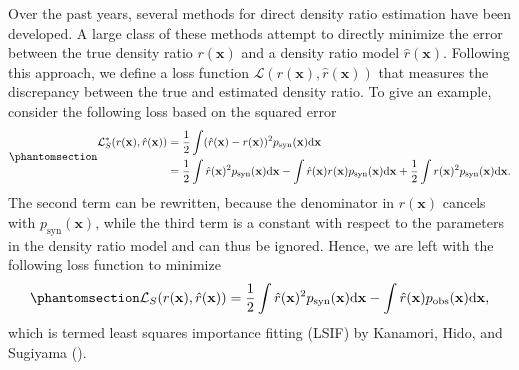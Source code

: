 \documentclass[
]{article}
\newcommand{\pobs}{p_{\text{obs}}}
\newcommand{\psyn}{p_{\text{syn}}}
\newcommand{\bx}{\mathbf{x}}
\begin{document}
Over the past years, several methods for direct density ratio estimation
have been developed. A large class of these methods attempt to directly
minimize the error between the true density ratio \(r(\bx)\) and a
density ratio model \(\hat{r}(\bx)\). Following this approach, we define
a loss function \(\mathcal{L}(r(\bx), \hat{r}(\bx))\) that measures the
discrepancy between the true and estimated density ratio. To give an
example, consider the following loss based on the squared error
\begin{equation}\phantomsection\label{eq-squared-error}{
\begin{aligned}
\mathcal{L}^*_S(r(\bx), \hat{r}(\bx)) &= 
\frac{1}{2} \int (\hat{r}(\bx) - r(\bx))^2 \psyn(\bx) \text{d}\bx \\
&= \frac{1}{2} \int \hat{r}(\bx)^2 \psyn(\bx) \text{d}\bx - 
\int \hat{r}(\bx) r(\bx) \psyn(\bx) \text{d}\bx + 
\frac{1}{2} \int r(\bx)^2 \psyn(\bx) \text{d}\bx.
\end{aligned}
}\end{equation} The second term can be rewritten, because the
denominator in \(r(\bx)\) cancels with \(\psyn(\bx)\), while the third
term is a constant with respect to the parameters in the density ratio
model and can thus be ignored. Hence, we are left with the following
loss function to minimize
\begin{equation}\phantomsection\label{eq-squared-error-loss}{
\mathcal{L}_S (r(\bx), \hat{r}(\bx)) = \frac{1}{2} \int \hat{r}(\bx)^2 \psyn(\bx) \text{d}\bx - \int \hat{r}(\bx) \pobs(\bx) \text{d}\bx,
}\end{equation} which is termed least squares importance fitting (LSIF)
by Kanamori, Hido, and Sugiyama
().
\end{document}
